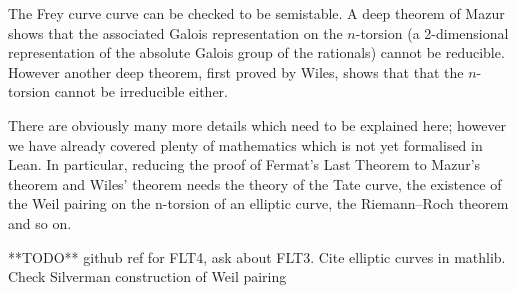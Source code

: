 The Frey curve curve can be checked to be semistable. A deep theorem of Mazur shows that the associated Galois representation on the $n$-torsion (a 2-dimensional representation of the absolute Galois group of the rationals) cannot be reducible. However another deep theorem, first proved by Wiles, shows that that the $n$-torsion cannot be irreducible either.

There are obviously many more details which need to be explained here; however we have already covered plenty of mathematics which is not yet formalised in Lean. In particular, reducing the proof of Fermat's Last Theorem to Mazur's theorem and Wiles' theorem needs the theory of the Tate curve, the existence of the Weil pairing on the n-torsion of an elliptic curve, the Riemann--Roch theorem and so on. 

**TODO** github ref for FLT4, ask about FLT3. Cite elliptic curves in mathlib. Check Silverman construction of Weil pairing 